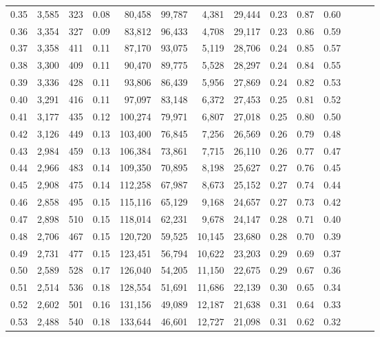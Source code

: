 \begin{tabular}{rrrrrrrrrrrrrr}
0.35 &  3,585 &  323 &  0.08 &   80,458 &   99,787 &   4,381 &  29,444 &  0.23 &  0.87 &      0.60 \\
0.36 &  3,354 &  327 &  0.09 &   83,812 &   96,433 &   4,708 &  29,117 &  0.23 &  0.86 &      0.59 \\
0.37 &  3,358 &  411 &  0.11 &   87,170 &   93,075 &   5,119 &  28,706 &  0.24 &  0.85 &      0.57 \\
0.38 &  3,300 &  409 &  0.11 &   90,470 &   89,775 &   5,528 &  28,297 &  0.24 &  0.84 &      0.55 \\
0.39 &  3,336 &  428 &  0.11 &   93,806 &   86,439 &   5,956 &  27,869 &  0.24 &  0.82 &      0.53 \\
0.40 &  3,291 &  416 &  0.11 &   97,097 &   83,148 &   6,372 &  27,453 &  0.25 &  0.81 &      0.52 \\
0.41 &  3,177 &  435 &  0.12 &  100,274 &   79,971 &   6,807 &  27,018 &  0.25 &  0.80 &      0.50 \\
0.42 &  3,126 &  449 &  0.13 &  103,400 &   76,845 &   7,256 &  26,569 &  0.26 &  0.79 &      0.48 \\
0.43 &  2,984 &  459 &  0.13 &  106,384 &   73,861 &   7,715 &  26,110 &  0.26 &  0.77 &      0.47 \\
0.44 &  2,966 &  483 &  0.14 &  109,350 &   70,895 &   8,198 &  25,627 &  0.27 &  0.76 &      0.45 \\
0.45 &  2,908 &  475 &  0.14 &  112,258 &   67,987 &   8,673 &  25,152 &  0.27 &  0.74 &      0.44 \\
0.46 &  2,858 &  495 &  0.15 &  115,116 &   65,129 &   9,168 &  24,657 &  0.27 &  0.73 &      0.42 \\
0.47 &  2,898 &  510 &  0.15 &  118,014 &   62,231 &   9,678 &  24,147 &  0.28 &  0.71 &      0.40 \\
0.48 &  2,706 &  467 &  0.15 &  120,720 &   59,525 &  10,145 &  23,680 &  0.28 &  0.70 &      0.39 \\
0.49 &  2,731 &  477 &  0.15 &  123,451 &   56,794 &  10,622 &  23,203 &  0.29 &  0.69 &      0.37 \\
0.50 &  2,589 &  528 &  0.17 &  126,040 &   54,205 &  11,150 &  22,675 &  0.29 &  0.67 &      0.36 \\
0.51 &  2,514 &  536 &  0.18 &  128,554 &   51,691 &  11,686 &  22,139 &  0.30 &  0.65 &      0.34 \\
0.52 &  2,602 &  501 &  0.16 &  131,156 &   49,089 &  12,187 &  21,638 &  0.31 &  0.64 &      0.33 \\
0.53 &  2,488 &  540 &  0.18 &  133,644 &   46,601 &  12,727 &  21,098 &  0.31 &  0.62 &      0.32 \\

\end{tabular}
